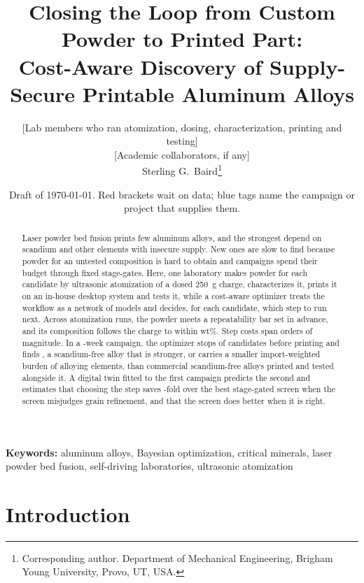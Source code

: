 \documentclass[11pt]{article}
\title{\textbf{Closing the Loop from Custom Powder to Printed Part:\\
Cost-Aware Discovery of Supply-Secure Printable Aluminum Alloys}}
\author{{[Lab members who ran atomization, dosing, characterization, printing and testing]}\\
{[Academic collaborators, if any]}\\
Sterling G.\ Baird\thanks{Corresponding author. Department of Mechanical Engineering, Brigham Young University, Provo, UT, USA.}}
\date{\ifdraft Draft of \today. Red brackets wait on data; blue tags name the campaign or project that supplies them.\fi}
\begin{document}
\maketitle

\begin{abstract}
Laser powder bed fusion prints few aluminum alloys, and the strongest depend on
scandium and other elements with insecure supply. New ones are slow to find
because powder for an untested composition is hard to obtain and campaigns
spend their budget through fixed stage-gates. Here, one laboratory makes powder
for each candidate by ultrasonic atomization of a dosed \SI{250}{\gram} charge,
characterizes it, prints it on an in-house desktop system and tests it, while a
cost-aware optimizer treats the workflow as a network of models and decides,
for each candidate, which step to run next. Across  atomization runs, the
powder meets a repeatability bar set in advance, and its composition follows
the charge to within  wt\%. Step costs span  orders of
magnitude. In a -week campaign, the optimizer stops  of 
candidates before printing and finds , a scandium-free alloy that is
stronger, or carries a smaller import-weighted burden of alloying elements, than
commercial scandium-free alloys printed and tested alongside it. A digital twin fitted to the first campaign predicts
the second and estimates that choosing the step saves -fold over the
best stage-gated screen when the screen misjudges grain refinement, and that the
screen does better when it is right.
\end{abstract}

\noindent\textbf{Keywords:} aluminum alloys, Bayesian optimization, critical
minerals, laser powder bed fusion, self-driving laboratories, ultrasonic atomization

\section{Introduction}
\label{sec:intro}
\end{document}
